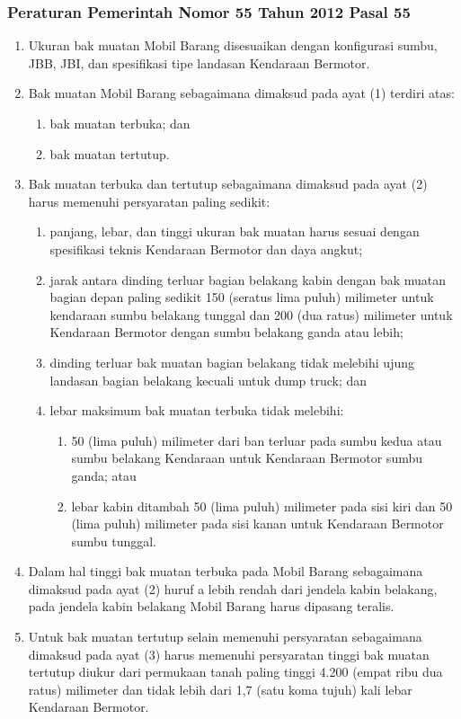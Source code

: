 \subsubsection{Peraturan Pemerintah Nomor 55 Tahun 2012 Pasal 55}

\begin{enumerate}
  \item Ukuran bak muatan Mobil Barang disesuaikan dengan konfigurasi sumbu, JBB, JBI, dan spesifikasi tipe landasan Kendaraan Bermotor.
  \item Bak muatan Mobil Barang sebagaimana dimaksud pada ayat (1) terdiri atas:
  \begin{enumerate}
    \item bak muatan terbuka; dan
    \item bak muatan tertutup. 
  \end{enumerate}
  \item Bak muatan terbuka dan tertutup sebagaimana dimaksud pada ayat (2) harus memenuhi persyaratan paling sedikit:
  \begin{enumerate}
    \item panjang, lebar, dan tinggi ukuran bak muatan harus sesuai dengan spesifikasi teknis Kendaraan Bermotor dan daya angkut;
    \item jarak antara dinding terluar bagian belakang kabin dengan bak muatan bagian depan paling sedikit 150 (seratus lima puluh) milimeter untuk kendaraan sumbu belakang tunggal dan 200 (dua ratus) milimeter untuk Kendaraan Bermotor dengan sumbu belakang ganda atau lebih;
    \item dinding terluar bak muatan bagian belakang tidak melebihi ujung landasan bagian belakang kecuali untuk dump truck; dan
    \item lebar maksimum bak muatan terbuka tidak melebihi:
    \begin{enumerate}
      \item 50 (lima puluh) milimeter dari ban terluar pada sumbu kedua atau sumbu belakang Kendaraan untuk Kendaraan Bermotor sumbu ganda; atau
      \item lebar kabin ditambah 50 (lima puluh) milimeter pada sisi kiri dan 50 (lima puluh) milimeter pada sisi kanan untuk Kendaraan Bermotor sumbu tunggal.
    \end{enumerate} 
  \end{enumerate}
  \item Dalam hal tinggi bak muatan terbuka pada Mobil Barang sebagaimana dimaksud pada ayat (2) huruf a lebih rendah dari jendela kabin belakang, pada jendela kabin belakang Mobil Barang harus dipasang teralis.
  \item Untuk bak muatan tertutup selain memenuhi persyaratan sebagaimana dimaksud pada ayat (3) harus memenuhi persyaratan tinggi bak muatan tertutup diukur dari permukaan tanah paling tinggi 4.200 (empat ribu dua ratus) milimeter dan tidak lebih dari 1,7 (satu koma tujuh) kali lebar Kendaraan Bermotor.
\end{enumerate}

